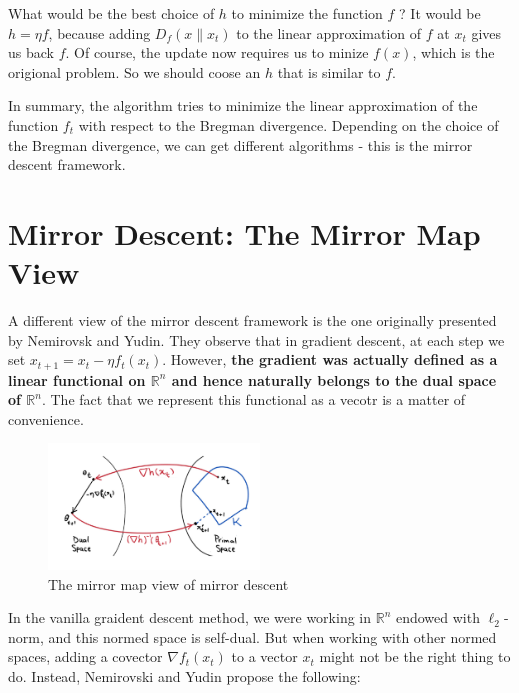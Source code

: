     \begin{note}
        What would be the best choice of $h$ to minimize the function $f$ ? It would be $h=\eta f$, because adding $D_f\left(x \| x_t\right)$ to the linear approximation of $f$ at $x_t$ gives us back $f$. Of course, the update now requires us to minize $f(x)$, which is the origional problem. So we should coose an $h$ that is similar to $f$.
    \end{note}

    In summary, the algorithm tries to minimize the linear approximation of the function $f_t$ with respect to the Bregman divergence. Depending on the choice of the Bregman divergence, we can get different algorithms - this is the mirror descent framework.

\section{Mirror Descent: The Mirror Map View}
A different view of the mirror descent framework is the one originally presented by Nemirovsk and Yudin. They observe that in gradient descent, at each step we set $x_{t+1}=x_t-\eta f_t\left(x_t\right)$. However, \textbf{the gradient was actually defined as a linear functional on $\mathbb{R}^n$ and hence naturally belongs to the dual space of $\mathbb{R}^n$}. The fact that we represent this functional as a vecotr is a matter of convenience.

\begin{figure}[H]
    \centering
    \includegraphics[width=0.5\textwidth]{figures/MD2.png}
    \caption{The mirror map view of mirror descent}
\end{figure}

In the vanilla graident descent method, we were working in $\mathbb{R}^n$ endowed with $\ell_2$-norm, and this normed space is self-dual. But when working with other normed spaces, adding a covector $\nabla f_t\left(x_t\right)$ to a vector $x_t$ might not be the right thing to do. Instead, Nemirovski and Yudin propose the following:

